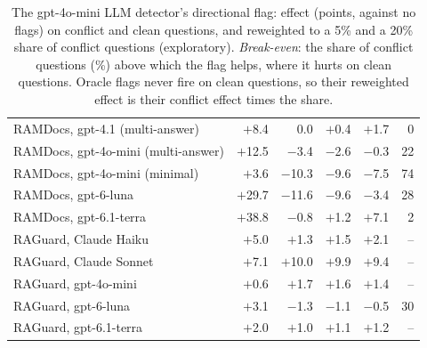 \begin{table}[t]
{\begin{tabular}{lrrrrr}
RAMDocs, gpt-4.1 (multi-answer) & $+$8.4 & 0.0 & $+$0.4 & $+$1.7 & 0 \\
RAMDocs, gpt-4o-mini (multi-answer) & $+$12.5 & $-$3.4 & $-$2.6 & $-$0.3 & 22 \\
RAMDocs, gpt-4o-mini (minimal) & $+$3.6 & $-$10.3 & $-$9.6 & $-$7.5 & 74 \\
RAMDocs, gpt-6-luna & $+$29.7 & $-$11.6 & $-$9.6 & $-$3.4 & 28 \\
RAMDocs, gpt-6.1-terra & $+$38.8 & $-$0.8 & $+$1.2 & $+$7.1 & 2 \\
RAGuard, Claude Haiku & $+$5.0 & $+$1.3 & $+$1.5 & $+$2.1 & -- \\
RAGuard, Claude Sonnet & $+$7.1 & $+$10.0 & $+$9.9 & $+$9.4 & -- \\
RAGuard, gpt-4o-mini & $+$0.6 & $+$1.7 & $+$1.6 & $+$1.4 & -- \\
RAGuard, gpt-6-luna & $+$3.1 & $-$1.3 & $-$1.1 & $-$0.5 & 30 \\
RAGuard, gpt-6.1-terra & $+$2.0 & $+$1.0 & $+$1.1 & $+$1.2 & -- \\
\bottomrule
\end{tabular}}
\caption{The gpt-4o-mini LLM detector's directional flag: effect (points, against no flags) on conflict and clean
questions, and reweighted to a 5\% and a 20\% share of conflict questions (exploratory). \emph{Break-even}: the share
of conflict questions (\%) above which the flag helps, where it hurts on clean questions. Oracle flags never fire on
clean questions, so their reweighted effect is their conflict effect times the share.}
\label{tab:prevalence}
\end{table}
